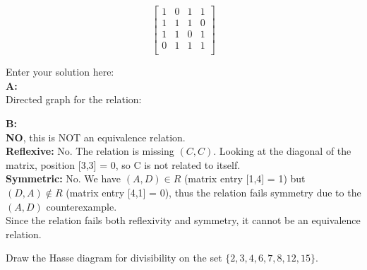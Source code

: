 \documentclass[10pt]{exam}
\begin{document}
\begin{questions}
$$
\begin{bmatrix} 
1 & 0 & 1 & 1 \\
1 & 1 & 1 & 0 \\
1 & 1 & 0 & 1 \\
0 & 1 & 1 & 1 \\
\end{bmatrix}
$$

\begin{solution}
    Enter your solution here:\\
    \textbf{A:}\\
    Directed graph for the relation:\\
    \begin{center}
    \end{center}
    \textbf{B:}\\
    \textbf{NO}, this is NOT an equivalence relation.\\
    \textbf{Reflexive:} No. The relation is missing $(C,C)$. Looking at the diagonal of the matrix, position [3,3] = 0, so C is not related to itself.\\
    \textbf{Symmetric:} No. We have $(A,D) \in R$ (matrix entry [1,4] = 1) but $(D,A) \notin R$ (matrix entry [4,1] = 0), thus the relation fails symmetry due to the $(A,D)$ counterexample.\\
    Since the relation fails both reflexivity and symmetry, it cannot be an equivalence relation.
\end{solution}

\question[4] Draw the Hasse diagram for divisibility on the set $\{2, 3, 4, 6, 7, 8, 12, 15\}$.


\end{questions}
\end{document}
